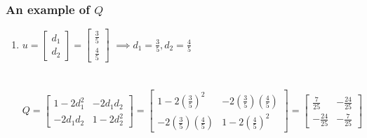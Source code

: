 \documentclass[12pt]{article}
\begin{document}
\subsubsection{An example of $Q$}
\begin{enumerate}[label=(\alph*)]
    \item $u =\begin{bmatrix} d_1 \\ d_2 \end{bmatrix} = \begin{bmatrix} \frac{3}{5} \\ \frac{4}{5} \end{bmatrix}$
    $\implies d_1 = \frac{3}{5}, d_2 = \frac{4}{5}$ \\ \\ \\
    $Q = \begin{bmatrix} 1 - 2d_1^2 & -2d_1 d_2 \\ -2d_1 d_2 & 1 - 2d_2^2 \end{bmatrix}
    = \begin{bmatrix} 1 - 2(\frac{3}{5})^2 & -2(\frac{3}{5})(\frac{4}{5}) \\ -2(\frac{3}{5})(\frac{4}{5}) & 1 - 2(\frac{4}{5})^2 \end{bmatrix}
    = \begin{bmatrix} \frac{7}{25} & -\frac{24}{25} \\ -\frac{24}{25} & -\frac{7}{25} \end{bmatrix}$ \\ \\
    

\end{enumerate}
\end{document}
